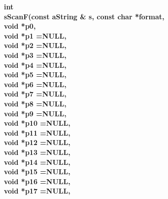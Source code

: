 \begin{flushleft} \textbf{%
int  \\ 
\settowidth{\otherStuffIncludeArgIndent}{sScanF(}%
sScanF(const aString \& s, const char *format, \\ 
\hspace{\otherStuffIncludeArgIndent}void *p0,\\ 
\hspace{\otherStuffIncludeArgIndent}void *p1  =NULL, \\ 
\hspace{\otherStuffIncludeArgIndent}void *p2  =NULL, \\ 
\hspace{\otherStuffIncludeArgIndent}void *p3  =NULL,\\ 
\hspace{\otherStuffIncludeArgIndent}void *p4  =NULL,\\ 
\hspace{\otherStuffIncludeArgIndent}void *p5  =NULL,\\ 
\hspace{\otherStuffIncludeArgIndent}void *p6  =NULL,\\ 
\hspace{\otherStuffIncludeArgIndent}void *p7  =NULL,\\ 
\hspace{\otherStuffIncludeArgIndent}void *p8  =NULL,\\ 
\hspace{\otherStuffIncludeArgIndent}void *p9  =NULL,\\ 
\hspace{\otherStuffIncludeArgIndent}void *p10  =NULL,\\ 
\hspace{\otherStuffIncludeArgIndent}void *p11  =NULL,\\ 
\hspace{\otherStuffIncludeArgIndent}void *p12  =NULL,\\ 
\hspace{\otherStuffIncludeArgIndent}void *p13  =NULL,\\ 
\hspace{\otherStuffIncludeArgIndent}void *p14  =NULL,\\ 
\hspace{\otherStuffIncludeArgIndent}void *p15  =NULL,\\ 
\hspace{\otherStuffIncludeArgIndent}void *p16  =NULL,\\ 
\hspace{\otherStuffIncludeArgIndent}void *p17  =NULL,\\ 
}
\end{flushleft}

